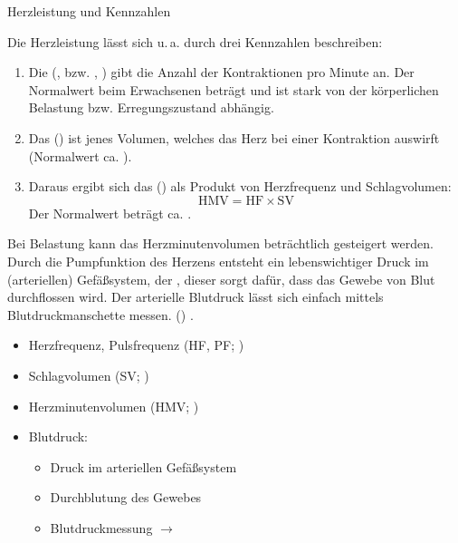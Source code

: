 \TextSlide
{Herzleistung und Kennzahlen}
{%
Die Herzleistung lässt sich u.\,a. durch drei Kennzahlen beschreiben: 
\begin{enumerate}
  \item Die  (, bzw. , )
  gibt die Anzahl der Kontraktionen pro Minute an.
  Der Normalwert beim Erwachsenen beträgt \PerMin* 
  und ist stark von der körperlichen Belastung 
  bzw. Erregungszustand abhängig.
  \item Das  () ist jenes Volumen, 
  welches das Herz bei einer Kontraktion auswirft (Normalwert ca.
  \Ml*).
  \item Daraus ergibt sich das  () 
  als Produkt 
  von Herzfrequenz 
  und Schlagvolumen:
  \begin{equation}
    \mbox{HMV} = \mbox{HF} \times \mbox{SV}
  \end{equation}
  Der Normalwert beträgt ca. \LPerMin*.
\end{enumerate}


Bei Belastung kann das Herzminutenvolumen beträchtlich
gesteigert werden. Durch die Pumpfunktion des Herzens
entsteht ein lebenswichtiger Druck im (arteriellen) Gefäßsystem, der
, 
dieser sorgt dafür, dass das Gewebe von Blut durchflossen
wird. Der arterielle Blutdruck lässt sich
einfach mittels Blutdruckmanschette messen. ()
\cite{Silbernagl3-Herz,Silbernagl3-Kreislaufsystem}. 
}
{%
\begin{itemize}
  \item Herzfrequenz, Pulsfrequenz 
  (HF, PF; \PerMin*)
  \item Schlagvolumen (SV; \Ml*)
  \item {Herzminutenvolumen} (HMV; \LPerMin*)
  \item Blutdruck:
  \begin{itemize}
    \item Druck im arteriellen Gefäßsystem
    \item Durchblutung des Gewebes
    \item Blutdruckmessung $\rightarrow$ 
  \end{itemize}
\end{itemize}
}
{}
{}
{}



